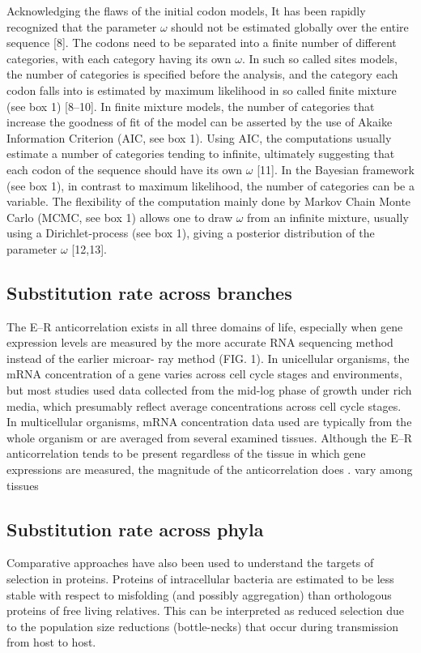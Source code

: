 Acknowledging the flaws of the initial \gls{codon} models, It has been rapidly recognized that the parameter $\omega$ should not be estimated globally over the entire sequence [8]. The codons need to be separated into a finite number of different categories, with each category having its own $\omega$. In such so called sites models, the number of categories is specified before the analysis, and the category each \gls{codon} falls into is estimated by maximum \gls{likelihood} in so called finite \gls{mixture} (see box 1) [8–10]. In finite mixture models, the number of categories that increase the goodness of fit of the model can be asserted by the use of Akaike Information Criterion (AIC, see box 1). Using AIC, the computations usually estimate a number of categories tending to infinite, ultimately suggesting that each \gls{codon} of the sequence should have its own $\omega$ [11]. In the Bayesian framework (see box 1), in contrast to maximum \gls{likelihood}, the number of categories can be a variable. The flexibility of the computation mainly done by Markov Chain Monte Carlo (MCMC, see box 1) allows one to draw $\omega$ from an infinite mixture, usually using a \gls{Dirichlet-process} (see box 1), giving a \gls{posterior} distribution of the parameter $\omega$ [12,13]. 

\subsection{Substitution rate across branches}


The E–R anticorrelation exists in all three domains of life, especially when gene
expression levels are measured by the more accurate \acrshort{RNA} sequencing method instead of the earlier microar- ray method (FIG. 1). In unicellular organisms, the mRNA concentration of a gene varies across cell cycle stages and environments, but most studies used data collected from the mid-log phase of growth under rich media, which presumably reflect average concentrations across
cell cycle stages. In multicellular organisms, mRNA concentration data used are typically from the whole organism or are averaged from several examined tissues. Although the E–R anticorrelation tends to be present regardless of the tissue in which gene expressions are measured, the magnitude of the anticorrelation does
.
vary among tissues

\subsection{Substitution rate across phyla}
Comparative approaches have also been used to understand the targets of selection in proteins. Proteins of intracellular bacteria are estimated to be less stable with respect to misfolding (and possibly aggregation) than orthologous proteins of free living relatives. This can be interpreted as reduced selection due to the population size reductions (bottle-necks) that occur during transmission from host to host.

